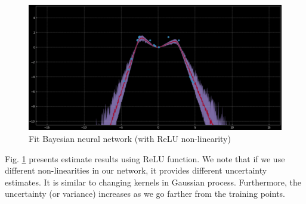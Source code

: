 \begin{figure}[H]
    \centering
    \includegraphics[width=\textwidth]{labs/12/images/exp_4.png}
    \caption{Fit Bayesian neural network (with ReLU non-linearity)}
    \label{fig:fit_BayesianNN_ReLU}
\end{figure}

Fig. \ref{fig:fit_BayesianNN_ReLU} presents estimate results using ReLU function. We note that if we use different non-linearities in our network, it provides different uncertainty estimates. It is similar to changing kernels in Gaussian process. Furthermore, the uncertainty (or variance) increases as we go farther from the training points. 
